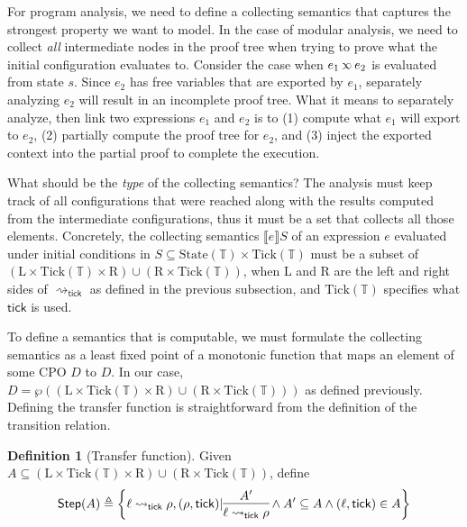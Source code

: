 \documentclass[acmsmall,review]{acmart}\settopmatter{printfolios=true,printccs=false,printacmref=false}
\theoremstyle{definition}
\newtheorem{definition}{Definition}[section]
\newcommand*{\Time}{\mathbb{T}}
\newcommand*{\Left}{\text{L}}
\newcommand*{\Right}{\text{R}}
\newcommand*{\State}{\text{State}}
\newcommand*{\Tick}{\text{Tick}}
\newcommand*{\semlink}{\mathbin{\rotatebox[origin=c]{180}{$\propto$}}}
\newcommand*{\link}[2]{{#1}\semlink{#2}}
\newcommand*{\sembracket}[1]{\lBrack{#1}\rBrack}
\newcommand*{\tick}{\mathsf{tick}}
\begin{document}
For program analysis, we need to define a collecting semantics that captures the strongest property we want to model.
In the case of modular analysis, we need to collect \emph{all} intermediate nodes in the proof tree when trying to prove what the initial configuration evaluates to.
Consider the case when $\link{e_1}{e_2}$ is evaluated from state $s$.
Since $e_2$ has free variables that are exported by $e_1$, separately analyzing $e_2$ will result in an incomplete proof tree.
What it means to separately analyze, then link two expressions $e_1$ and $e_2$ is to (1) compute what $e_1$ will export to $e_2$, (2) partially compute the proof tree for $e_2$, and (3) inject the exported context into the partial proof to complete the execution.

What should be the \emph{type} of the collecting semantics?
The analysis must keep track of all configurations that were reached along with the results computed from the intermediate configurations, thus it must be a set that collects all those elements.
Concretely, the collecting semantics $\sembracket{e}S$ of an expression $e$ evaluated under initial conditions in $S\subseteq\State(\Time)\times\Tick(\Time)$ must be a subset of $(\Left\times\Tick(\Time)\times\Right )\cup(\Right\times\Tick(\Time))$, when $\Left$ and $\Right$ are the left and right sides of $\rightsquigarrow_\tick$ as defined in the previous subsection, and $\Tick(\Time)$ specifies what $\tick$ is used.

To define a semantics that is computable, we must formulate the collecting semantics as a least fixed point of a monotonic function that maps an element of some CPO $D$ to $D$.
In our case, $D=\wp((\Left\times\Tick(\Time)\times\Right )\cup(\Right\times\Tick(\Time)))$ as defined previously.
Defining the transfer function is straightforward from the definition of the transition relation.

\begin{definition}[Transfer function]
  Given $A\subseteq(\Left\times\Tick(\Time)\times\Right )\cup(\Right\times\Tick(\Time))$, define
  \[
    \mathsf{Step}(A)\triangleq
    \left\{\ell\rightsquigarrow_\tick\rho, (\rho,\tick)|
    \begin{prooftree}[center=true]
      \hypo{A'}\infer1{\ell\rightsquigarrow_\tick\rho}
    \end{prooftree}\wedge
    A'\subseteq A\wedge(\ell,\tick)\in A
    \right\}
  \]
\end{definition}
\end{document}
